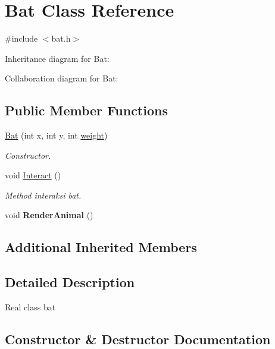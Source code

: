 \hypertarget{classBat}{}\section{Bat Class Reference}
\label{classBat}


{\ttfamily \#include $<$bat.\+h$>$}



Inheritance diagram for Bat\+:


Collaboration diagram for Bat\+:
\subsection*{Public Member Functions}
\begin{DoxyCompactItemize}
\item 
\hyperlink{classBat_a144e7910be857e0dfc12569f586d05f0}{Bat} (int x, int y, int \hyperlink{classAnimal_a9a3b22f243f7109c57f36b3c660feb6e}{weight})
\begin{DoxyCompactList}\small\item\em Constructor. \end{DoxyCompactList}\item 
void \hyperlink{classBat_acf00d26782fd4b1c518a7ba7ac611b11}{Interact} ()\hypertarget{classBat_acf00d26782fd4b1c518a7ba7ac611b11}{}\label{classBat_acf00d26782fd4b1c518a7ba7ac611b11}

\begin{DoxyCompactList}\small\item\em Method interaksi bat. \end{DoxyCompactList}\item 
void {\bfseries Render\+Animal} ()\hypertarget{classBat_a2a92f2f84819c17cba30d85ce008fc9c}{}\label{classBat_a2a92f2f84819c17cba30d85ce008fc9c}

\end{DoxyCompactItemize}
\subsection*{Additional Inherited Members}


\subsection{Detailed Description}
Real class bat 

\subsection{Constructor \& Destructor Documentation}
